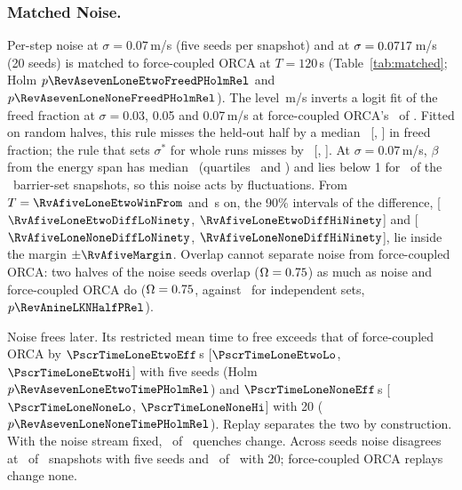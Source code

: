 \subsubsection{Matched Noise.}
Per-step noise at $\sigma=0.07$\,m/s (five seeds per snapshot) and at $\sigma=0.0717$\,m/s (20 seeds) is matched to force-coupled ORCA at $T=120$\,s (Table~\ref{tab:matched}; Holm $p\RevAsevenLoneEtwoFreedPHolmRel$ and $p\RevAsevenLoneNoneFreedPHolmRel$). The level \RunNOneSigma\,m/s inverts a logit fit of the freed fraction at $\sigma=0.03$, 0.05 and 0.07\,m/s at force-coupled ORCA's \RzTonezeroLoneOrcaFreed\ of \RzTonezeroLoneN. Fitted on random halves, this rule misses the held-out half by a median \RzTfiveHeldoutMed\ [\RzTfiveHeldoutLo, \RzTfiveHeldoutHi] in freed fraction; the rule that sets $\sigma^\ast$ for whole runs misses by \RzTfiveWholeMed\ [\RzTfiveWholeLo, \RzTfiveWholeHi]. At $\sigma=0.07$\,m/s, $\beta$ from the energy span has median \PthreeBetaSevenSpanMed\ (quartiles \PthreeBetaSevenSpanQone\ and \PthreeBetaSevenSpanQthree) and lies below 1 for \RxBetaSevenSpanBelowOne\ of the \LoneBarN\ barrier-set snapshots, so this noise acts by fluctuations. From $T=\RvAfiveLoneEtwoWinFrom$ and \RvAfiveLoneNoneWinFrom\,s on, the 90\% intervals of the difference, [$\RvAfiveLoneEtwoDiffLoNinety$, $\RvAfiveLoneEtwoDiffHiNinety$] and [$\RvAfiveLoneNoneDiffLoNinety$, $\RvAfiveLoneNoneDiffHiNinety$], lie inside the margin $\pm\RvAfiveMargin$. Overlap cannot separate noise from force-coupled ORCA: two halves of the noise seeds overlap ($\Omega=0.75$) as much as noise and force-coupled ORCA do ($\Omega=0.75$, against \PscrLKNHalfEJ\ for independent sets, $p\RevAnineLKNHalfPRel$).

Noise frees later. Its restricted mean time to free exceeds that of force-coupled ORCA by $\PscrTimeLoneEtwoEff$\,s [$\PscrTimeLoneEtwoLo$, $\PscrTimeLoneEtwoHi$] with five seeds (Holm $p\RevAsevenLoneEtwoTimePHolmRel$) and $\PscrTimeLoneNoneEff$\,s [$\PscrTimeLoneNoneLo$, $\PscrTimeLoneNoneHi$] with 20 ($p\RevAsevenLoneNoneTimePHolmRel$). Replay separates the two by construction. With the noise stream fixed, \RvAtenFlips\ of \RvAtenNPairs\ quenches change. Across seeds noise disagrees at \TabThreeLKNoiseDisagree\ of \TabThreeLKNoiseSnaps\ snapshots with five seeds and \RevAsevenLoneNoneReplayDiscA\ of \EtwoNLK\ with 20; force-coupled ORCA replays change none.

